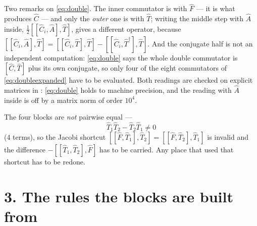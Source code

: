 \documentclass[11pt]{article}
\begin{document}
Two remarks on \eqref{eq:double}. The inner commutator is with $\hat F$ --- it
is what produces $\hat C$ --- and only the \emph{outer} one is with $\hat T$;
writing the middle step with $\hat A$ inside,
$\tfrac12[[\hat C_i,\hat A],\hat T]$, gives a different operator, because
$[[\hat C_i,\hat A],\hat T]=[[\hat C_i,\hat T],\hat T]
-[[\hat C_i,\hat T^\dagger],\hat T]$. And the conjugate half is not an
independent computation: \eqref{eq:double} says the whole double commutator is
$[\hat C,\hat T]$ plus its own conjugate, so only four of the eight
commutators of \eqref{eq:doubleexpanded} have to be evaluated.
Both readings are checked on explicit matrices in
: \eqref{eq:double} holds to machine
precision, and the reading with $\hat A$ inside is off by a matrix norm of
order $10^4$.

The four blocks are \emph{not} pairwise equal ---
\begin{equation}
  \hat T_1\hat T_2-\hat T_2\hat T_1\neq0
\end{equation}
(4 terms), so the Jacobi shortcut
$[[\hat F,\hat T_1],\hat T_2]=[[\hat F,\hat T_2],\hat T_1]$ is invalid and the
difference $-[[\hat T_1,\hat T_2],\hat F]$ has to be carried. Any place that
used that shortcut has to be redone.

\section*{3. The rules the blocks are built from}
\end{document}
